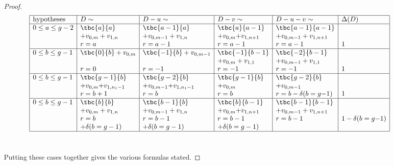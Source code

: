 \begin{proof}
{\footnotesize\[
    \hspace{-.5cm}\begin{array}{|l|l|l|l|l|l|}
        \hline
        \mathrm{hypotheses} & D\sim & D-u\sim & D-v\sim & D-u-v\sim & \Delta(D)\\\hline
        0 \leq a \leq g-2
            & \tbc{a}{a}  
            & \tbc{a-1}{a} 
            & \tbc{a}{a-1} 
            & \tbc{a-1}{a-1}
            & \empty\\
        \empty 
            & + v_{0,m} + v_{1,n}
            & + v_{0,m-1} + v_{1,n}
            & + v_{0,m}{+}v_{1,n+1}
            & + v_{0,m-1} + v_{1,n+1}
            & \empty\\
        \empty
            & r = a
            & r = a-1
            & r = a-1
            & r = a-1
            & 1\\\hline
        0 \leq b \leq g-1
            & \tbc{0}{b} + v_{0,m}
            & \tbc{-1}{b} + v_{0,m-1}
            & \tbc{-1}{b-1}
            & \tbc{-2}{b-1}
            & \empty\\
        \empty 
            &
            &
            & + v_{0,m} + v_{1,1}
            & + v_{0,m-1} + v_{1,1}
            & \empty\\
        \empty
            & r = 0
            & r = -1
            & r = -1
            & r = -1
            & 1\\\hline
        0 \leq b \leq g-1
            & \tbc{g-1}{b}
            & \tbc{g-2}{b}
            & \tbc{g-1}{b}
            & \tbc{g-2}{b}
            & \empty\\
        \empty 
            & + v_{0,m}{+}v_{1,n_1-1}
            & + v_{0,m-1}{+}v_{1,n_1-1}
            & + v_{0,m}
            & + v_{0,m-1}
            & \empty\\
        \empty 
            & r = b + 1
            & r = b
            & r = b
            & r = b - \delta(b = g{-}1)
            & 1\\\hline
        0 \leq b \leq g-1
            & \tbc{b}{b}
            & \tbc{b-1}{b}
            & \tbc{b}{b-1}
            & \tbc{b-1}{b-1}
            & \empty\\
        \empty
            & + v_{0,m} + v_{1,n}
            & + v_{0,m-1} + v_{1,n}
            & + v_{0,m}{+}v_{1,n+1}
            & + v_{0,m-1} + v_{1,n+1}
            & \empty\\
        \empty 
            & r = b
            & r = b-1
            & r = b-1
            & r = b-1
            & 1 - \delta(b = g{-}1) \\
        \empty 
            & + \delta(b = g-1)
            & + \delta(b = g-1)
            & + \delta(b = g-1)
            & \empty
            & \empty\\\hline
    \end{array}\]}\
    
    Putting these cases together gives the various formulas stated.
\end{proof}



